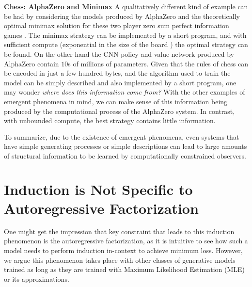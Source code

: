 \documentclass[twoside]{article}
\begin{document}
\textbf{Chess: AlphaZero and Minimax}
A qualitatively different kind of example can be had by considering the models produced by AlphaZero \citep{silver2018general} and the theoretically optimal minimax solution for these two player zero sum perfect information games \citep{vonneumann1928theorie,shannon1950chess}. The minimax strategy can be implemented by a short program, and with sufficient compute (exponential in the size of the board \citep{fraenkel1981computing}) the optimal strategy can be found. On the other hand the CNN policy and value network produced by AlphaZero contain $10$s of millions of parameters. Given that the rules of chess can be encoded in just a few hundred bytes, and the algorithm used to train the model can be simply described and also implemented by a short program, one may wonder \emph{where does this information come from?} With the other examples of emergent phenomena in mind, we can make sense of this information being produced by the computational process of the AlphaZero system. In contrast, with unbounded compute, the best strategy contains little information.

%

%

To summarize, due to the existence of emergent phenomena, even systems that have simple generating processes or simple descriptions can lead to large amounts of structural information to be learned by computationally constrained observers.

\section{Induction is Not Specific to Autoregressive Factorization}\label{app:induction-not-specific}
%
One might get the impression that key constraint that leads to this induction phenomenon is the autoregressive factorization, as it is intuitive to see how such a model needs to perform induction in-context to achieve minimum loss. However, we argue this phenomenon takes place with other classes of generative models trained as long as they are trained with Maximum Likelihood Estimation (MLE) or its approximations. 
\end{document}
